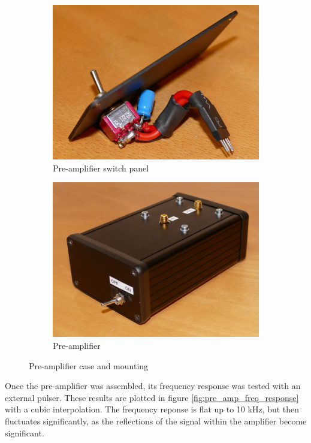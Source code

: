 \documentclass[a4paper]{article}
\begin{document}
\begin{appendices}
\begin{figure}[ht!]
\begin{subfigure}[t]{0.48\textwidth}
\includegraphics[width=\textwidth]{fig/P1170907-cropped.jpg}
\caption{Pre-amplifier switch panel}
\label{fig:pre_amp_switch}
\end{subfigure}
%
\begin{subfigure}[t]{0.48\textwidth}
\includegraphics[width=\textwidth]{fig/P1170874-cropped.jpg}
\caption{Pre-amplifier}
\label{fig:pre_amp}
\end{subfigure}
%
\caption{Pre-amplifier case and mounting}
\label{fig:pre_amp_mounting}
\end{figure}


\FloatBarrier
Once the pre-amplifier was assembled, its frequency response was tested with an external pulser.
These results are plotted in figure \ref{fig:pre_amp_freq_response} with a cubic interpolation.
The frequency reponse is flat up to 10 kHz, but then fluctuates significantly, as the reflections of the signal within the amplifier become significant.


\end{appendices}
\end{document}
